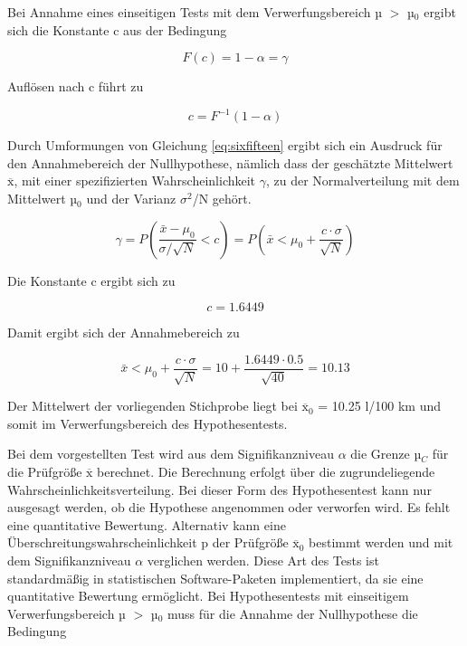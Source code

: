 \noindent Bei Annahme eines einseitigen Tests mit dem Verwerfungsbereich µ $\mathrm{>}$ µ$_{0}$ ergibt sich die Konstante c aus der Bedingung

\begin{equation}\label{eq:sixsixteen}
F\left(c\right)=1-\alpha =\gamma
\end{equation}

\noindent Aufl\"{o}sen nach c f\"{u}hrt zu

\begin{equation}\label{eq:sixseventeen}
c=F^{-1} (1-\alpha)
\end{equation}

\noindent Durch Umformungen von Gleichung \eqref{eq:sixfifteen} ergibt sich ein Ausdruck f\"{u}r den Annahmebereich der Nullhypothese, n\"{a}mlich dass der gesch\"{a}tzte Mittelwert $\overline{\mathrm{x}}$, mit einer spezifizierten Wahrscheinlichkeit $\gamma$, zu der Normalverteilung mit dem Mittelwert µ$_{0}$ und der Varianz $\sigma^{2}$/N geh\"{o}rt.

\begin{equation}\label{eq:sixeighteen}
\gamma =P\left(\dfrac{\bar{x}-\mu _{0} }{\sigma /\sqrt{N} } <c\right)=P\left(\bar{x}<\mu _{0} +\dfrac{c\cdot \sigma }{\sqrt{N} } \right)
\end{equation}

\noindent Die Konstante c ergibt sich zu 

\begin{equation}\label{eq:sixnineteen}
c=1.6449
\end{equation}

\noindent Damit ergibt sich der Annahmebereich zu

\begin{equation}\label{eq:sixtwenty}
\bar{x}<\mu _{0} +\dfrac{c\cdot \sigma }{\sqrt{N}} =10+\dfrac{1.6449\cdot 0.5}{\sqrt{40}} =10.13
\end{equation}

\noindent Der Mittelwert der vorliegenden Stichprobe liegt bei ${\overline{\mathrm{x}}}_0$ = 10.25 l/100 km und somit im Verwerfungsbereich des Hypothesentests.\noindent

\noindent Bei dem vorgestellten Test wird aus dem Signifikanzniveau $\alpha$ die Grenze µ$_{C}$ f\"{u}r die Pr\"{u}fgr\"{o}{\ss}e $\overline{\mathrm{x}}$ berechnet. Die Berechnung erfolgt \"{u}ber die zugrundeliegende Wahrscheinlichkeitsverteilung. Bei dieser Form des Hypothesentest kann nur ausgesagt werden, ob die Hypothese angenommen oder verworfen wird. Es fehlt eine quantitative Bewertung. Alternativ kann eine \"{U}berschreitungswahrscheinlichkeit p der Pr\"{u}fgr\"{o}{\ss}e ${\overline{\mathrm{x}}}_0$ bestimmt werden und mit dem Signifikanzniveau $\alpha$ verglichen werden. Diese Art des Tests ist standardm\"{a}{\ss}ig in statistischen Software-Paketen implementiert, da sie eine quantitative Bewertung erm\"{o}glicht. Bei Hypothesentests mit einseitigem Verwerfungsbereich µ $\mathrm{>}$ µ$_{0}$ muss f\"{u}r die Annahme der Nullhypothese die Bedingung

